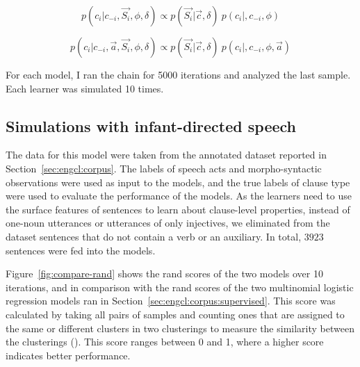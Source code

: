 \begin{equation} \label{eq:engcl:base}
p(c_{i}| c_{-i}, \vec{S_{i}},\phi, \delta) \propto p(\vec{S_{i}}| \vec{c}, \delta)\ p(c_{i}|, c_{-i}, \phi)
\end{equation}

\begin{equation} \label{eq:engcl:target}
p(c_{i}| c_{-i}, \vec{a}, \vec{S_{i}},\phi, \delta) \propto p(\vec{S_{i}}| \vec{c}, \delta)\ p(c_{i}|, c_{-i}, \phi,\vec{a})
\end{equation}



For each model, I ran the chain for 5000 iterations and analyzed the last sample. Each learner was simulated 10 times. 


\subsection{Simulations with infant-directed speech}
\label{sec:engcl:model:results}

The data for this model were taken from the annotated dataset reported in Section~\ref{sec:engcl:corpus}. The labels of speech acts and morpho-syntactic observations were used as input to the models, and the true labels of clause type were used to evaluate the performance of the models. As the learners need to use the surface features of sentences to learn about clause-level properties, instead of one-noun utterances or utterances of only injectives, we eliminated from the dataset sentences that do not contain a verb or an auxiliary. In total, $3923$  sentences were fed into the models.


Figure~\ref{fig:compare-rand} shows the rand scores of the two models over 10 iterations, and in comparison with the rand scores of the two multinomial logistic regression models ran in Section~\ref{sec:engcl:corpus:supervised}. 
This score was calculated by taking all pairs of samples and counting ones that are assigned to the same or different clusters in two clusterings to measure the similarity between the clusterings (\cite{rand1971}). This score ranges between 0 and 1, where a higher score indicates better performance. 

